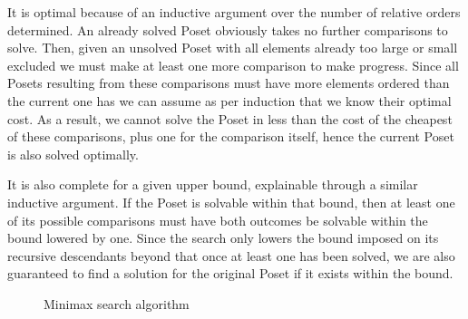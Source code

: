 \documentclass[10pt,journal,compsoc]{IEEEtran}
\begin{document}
It is optimal because of an inductive argument over the number of relative orders determined. An
already solved Poset obviously takes no further comparisons to solve. Then, given an unsolved Poset
with all elements already too large or small excluded we must make at least one more comparison to
make progress. Since all Posets resulting from these comparisons must have more elements ordered
than the current one has we can assume as per induction that we know their optimal cost. As a result, we
cannot solve the Poset in less than the cost of the cheapest of these comparisons, plus one for the
comparison itself, hence the current Poset is also solved optimally.

It is also complete for a given upper bound, explainable through a similar inductive argument. If
the Poset is solvable within that bound, then at least one of its possible comparisons must have both
outcomes be solvable within the bound lowered by one. Since the search only lowers the bound imposed
on its recursive descendants beyond that once at least one has been solved, we are also guaranteed
to find a solution for the original Poset if it exists within the bound.

\begin{figure}
  \caption{Minimax search algorithm} \label{fig:minimax_search}
\end{figure}
\end{document}
